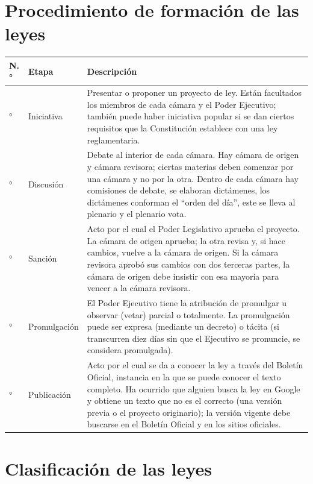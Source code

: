 \documentclass[12pt,oneside]{book}
\begin{document}
\section{Procedimiento de formación de las leyes}

\begin{table}[H]
\centering
\begin{tabularx}{\textwidth}{>{\centering\arraybackslash}p{} >{\raggedright\arraybackslash}p{} >{\raggedright\arraybackslash}X}
\toprule
\textbf{N.°} & \textbf{Etapa} & \textbf{Descripción} \\
\midrule
1° & Iniciativa &
Presentar o proponer un proyecto de ley. Están facultados los miembros de cada cámara y el Poder Ejecutivo; también puede haber iniciativa popular si se dan ciertos requisitos que la Constitución establece con una ley reglamentaria. \\
\addlinespace
2° & Discusión &
Debate al interior de cada cámara. Hay cámara de origen y cámara revisora; ciertas materias deben comenzar por una cámara y no por la otra. Dentro de cada cámara hay comisiones de debate, se elaboran dictámenes, los dictámenes conforman el ``orden del día'', este se lleva al plenario y el plenario vota. \\
\addlinespace
3° & Sanción &
Acto por el cual el Poder Legislativo aprueba el proyecto. La cámara de origen aprueba; la otra revisa y, si hace cambios, vuelve a la cámara de origen. Si la cámara revisora aprobó sus cambios con dos terceras partes, la cámara de origen debe insistir con esa mayoría para vencer a la cámara revisora. \\
\addlinespace
4° & Promulgación &
El Poder Ejecutivo tiene la atribución de promulgar u observar (vetar) parcial o totalmente. La promulgación puede ser expresa (mediante un decreto) o tácita (si transcurren diez días sin que el Ejecutivo se pronuncie, se considera promulgada). \\
\addlinespace
5° & Publicación &
Acto por el cual se da a conocer la ley a través del Boletín Oficial, instancia en la que se puede conocer el texto completo. Ha ocurrido que alguien busca la ley en Google y obtiene un texto que no es el correcto (una versión previa o el proyecto originario); la versión vigente debe buscarse en el Boletín Oficial y en los sitios oficiales. \\
\bottomrule
\end{tabularx}
\end{table}

\section{Clasificación de las leyes}
\end{document}
